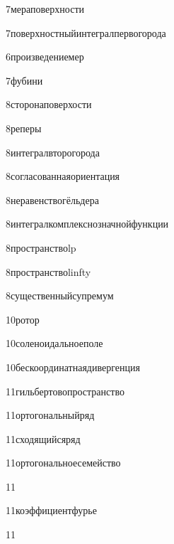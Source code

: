 {7}{мераповерхности}

{7}{поверхностныйинтегралпервогорода}

{6}{произведениемер}

{7}{фубини}

{8}{сторонаповерхости}

{8}{реперы}

{8}{интегралвторогорода}

{8}{согласованнаяориентация}

{8}{неравенствогёльдера}

{8}{интегралкомплекснозначнойфункции}

{8}{пространствоlp}

{8}{пространствоlinfty}

{8}{существенныйсупремум}

{10}{ротор}

{10}{соленоидальноеполе}

{10}{бескоординатнаядивергенция}

{11}{гильбертовопространство}

{11}{ортогональныйряд}

{11}{сходящийсяряд}

{11}{ортогональноесемейство}
\label{Ортонормированная система}

{11}{}

{11}{коэффициентфурье}
\label{ряд фурье}

{11}{}

